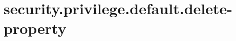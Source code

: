 \section{security.privilege.default.delete-property}
\label{configuration:SecurityPrivilegeDefaultDeleteProperty}
\TODO

